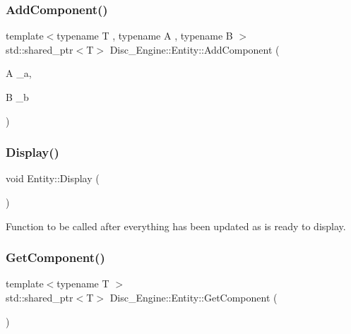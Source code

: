 \subsubsection{\texorpdfstring{Add\+Component()}{AddComponent()}\hspace{0.1cm}{\footnotesize\ttfamily [3/3]}}
{\footnotesize\ttfamily template$<$typename T , typename A , typename B $>$ \\
std\+::shared\+\_\+ptr$<$T$>$ Disc\+\_\+\+Engine\+::\+Entity\+::\+Add\+Component (\begin{DoxyParamCaption}\item[{A}]{\+\_\+a,  }\item[{B}]{\+\_\+b }\end{DoxyParamCaption})\hspace{0.3cm}{\ttfamily [inline]}}

\mbox{\label{class_disc___engine_1_1_entity_a72ab24c9e9ed682c7052e83cac5ca4dd}} 
\subsubsection{\texorpdfstring{Display()}{Display()}}
{\footnotesize\ttfamily void Entity\+::\+Display (\begin{DoxyParamCaption}{ }\end{DoxyParamCaption})\hspace{0.3cm}{\ttfamily [private]}}



Function to be called after everything has been updated as is ready to display. 

\mbox{\label{class_disc___engine_1_1_entity_a624aeeec279e9e8240d47c3c892e01e3}} 
\subsubsection{\texorpdfstring{Get\+Component()}{GetComponent()}}
{\footnotesize\ttfamily template$<$typename T $>$ \\
std\+::shared\+\_\+ptr$<$T$>$ Disc\+\_\+\+Engine\+::\+Entity\+::\+Get\+Component (\begin{DoxyParamCaption}{ }\end{DoxyParamCaption})\hspace{0.3cm}{\ttfamily [inline]}}

